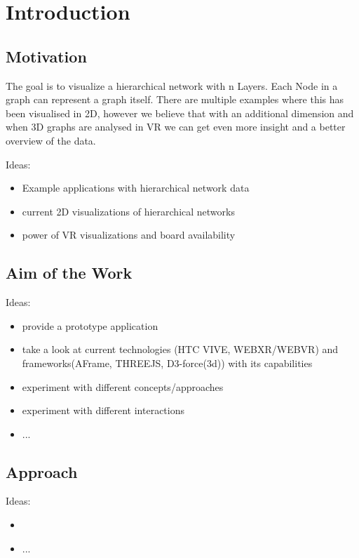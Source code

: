 \chapter{Introduction}

\section{Motivation}

The	 goal	 is	 to	 visualize	 a	 hierarchical	 network	 with	 n	 Layers.	 Each	 Node	 in	 a	 graph	 can	
represent	a	graph	itself.	There	are	multiple	examples	where	this	has	been	visualised	in	2D,	
however	we	believe	that	with	an	additional	dimension	and	when	3D	graphs	are	analysed	in	
VR	we	can	get	even	more	insight	and	a	better	overview	of	the	data.	

Ideas:
\begin{itemize}
    \item Example applications with hierarchical network data
    \item current 2D visualizations of hierarchical networks
    \item power of VR visualizations and board availability
\end{itemize}

\section{Aim of the Work}

Ideas:
\begin{itemize}
    \item provide a prototype application
    \item take a look at current technologies (HTC VIVE, WEBXR/WEBVR) and frameworks(AFrame, THREEJS, D3-force(3d)) with its capabilities 
    \item experiment with different concepts/approaches
    \item experiment with different interactions
    \item ...
\end{itemize}

\section{Approach}

Ideas:
\begin{itemize}
    \item 
    \item ...
\end{itemize}